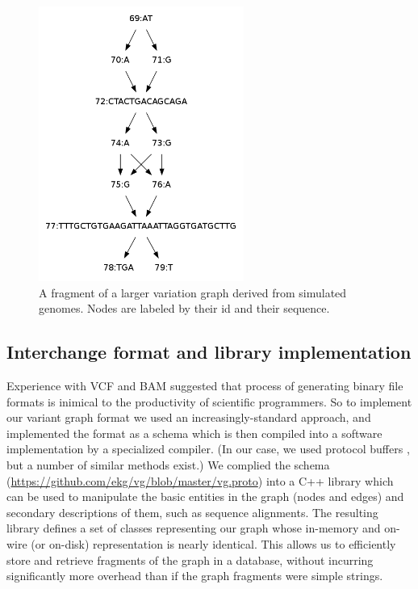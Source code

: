 \documentclass{article}
\begin{document}
\begin{figure}[t]
\centering
\includegraphics[width=0.6\textwidth]{figures/variationgraph}
\caption{\label{fig:variationgraph}
A fragment of a larger variation graph derived from simulated genomes. Nodes are labeled by their id and their sequence.
}
\end{figure}

\subsection{Interchange format and library implementation}

Experience with VCF \cite{danecek2011} and BAM \cite{li2009sambam} suggested that process of generating binary file formats is inimical to the productivity of scientific programmers.
So to implement our variant graph format we used an increasingly-standard approach, and implemented the format as a schema which is then compiled into a software implementation by a specialized compiler. (In our case, we used protocol buffers \cite{protobuf}, but a number of similar methods exist.)
We complied the schema (\url{https://github.com/ekg/vg/blob/master/vg.proto}) into a C++ library which can be used to manipulate the basic entities in the graph (nodes and edges) and secondary descriptions of them, such as sequence alignments.
The resulting library defines a set of classes representing our graph whose in-memory and on-wire (or on-disk) representation is nearly identical.
This allows us to efficiently store and retrieve fragments of the graph in a database, without incurring significantly more overhead than if the graph fragments were simple strings.
\end{document}
